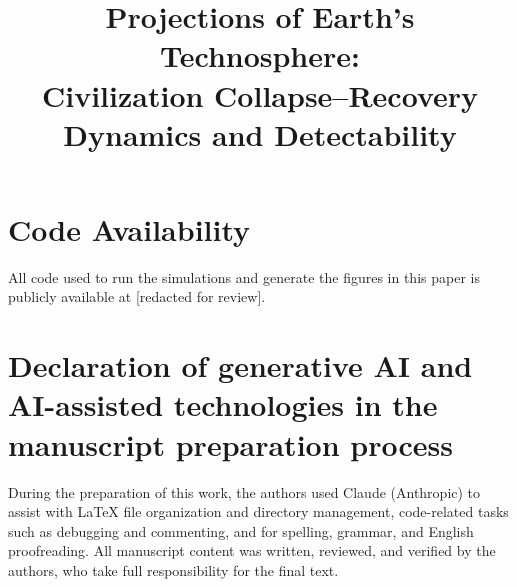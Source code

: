 \documentclass[11pt]{article}
\title{Projections of Earth's Technosphere: \\ Civilization Collapse--Recovery Dynamics and Detectability}
\author{}
\date{}
\begin{document}
\maketitle










\section*{Code Availability}
All code used to run the simulations and generate the figures in this paper is publicly available at [redacted for review].

\section*{Declaration of generative AI and AI-assisted technologies in the manuscript preparation process}
During the preparation of this work, the authors used Claude (Anthropic) to assist with \LaTeX{} file organization and directory management, code-related tasks such as debugging and commenting, and for spelling, grammar, and English proofreading. All manuscript content was written, reviewed, and verified by the authors, who take full responsibility for the final text.



\end{document}
